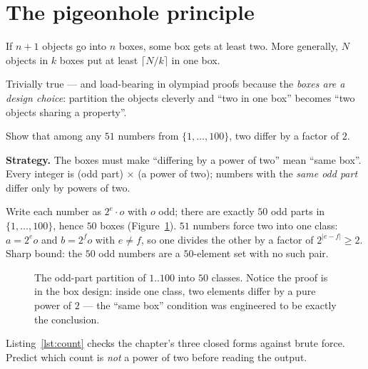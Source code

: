 \section{The pigeonhole principle}\label{sec:pigeon}

\begin{theorem}[Pigeonhole]
If $n + 1$ objects go into $n$ boxes, some box gets at least two. More
generally, $N$ objects in $k$ boxes put at least $\lceil N/k \rceil$ in
one box.
\end{theorem}

Trivially true --- and load-bearing in olympiad proofs because the
\emph{boxes are a design choice}: partition the objects cleverly and
``two in one box'' becomes ``two objects sharing a property''.

\begin{example}\label{ex:pigeon}
Show that among any $51$ numbers from $\{1, \dots, 100\}$, two differ by
a factor of $2$.
\par\smallskip
\textbf{Strategy.} The boxes must make ``differing by a power of two''
mean ``same box''. Every integer is (odd part) $\times$ (a power of two);
numbers with the \emph{same odd part} differ only by powers of two.
\par\smallskip
\begin{solution}
Write each number as $2^e \cdot o$ with $o$ odd; there are exactly $50$
odd parts in $\{1, \dots, 100\}$, hence $50$ boxes
(Figure~\ref{fig:pigeon}). $51$ numbers force two into one class:
$a = 2^e o$ and $b = 2^f o$ with $e \ne f$, so one divides the other by
a factor of $2^{|e-f|} \ge 2$. Sharp bound: the $50$ odd numbers are a
$50$-element set with no such pair.
\end{solution}
\end{example}

\begin{figure}[ht]\centering

\caption{The odd-part partition of $1..100$ into $50$ classes. Notice
the proof is in the box design: inside one class, two elements differ by
a pure power of $2$ --- the ``same box'' condition was engineered to be
exactly the conclusion.}
\label{fig:pigeon}
\end{figure}

\begin{checkpoint}
Listing~\ref{lst:count} checks the chapter's three closed forms against
brute force. Predict which count is \emph{not} a power of two before
reading the output.
\end{checkpoint}

